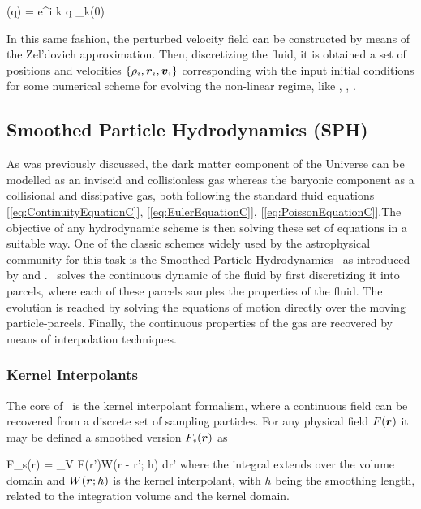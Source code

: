 \documentclass[a4,useAMS,usenatbib,usegraphicx,12pt]{article}
\begin{document}
{ \bds{\Psi}(\bds q) = \int {}e^{i \bds k \cdot \bds q}
\delta_{\bds k}(0) }

In this same fashion, the perturbed velocity field can be constructed by means
of the Zel'dovich approximation. Then, discretizing the fluid, it is obtained a 
set of positions and velocities $\{\rho_i,\boldsymbol{ r }_i, \boldsymbol{ v }_i\}$ corresponding 
with the input initial conditions for some numerical scheme for evolving the 
non-linear regime, like \SPH, \VPH, \AMR.


\subsection*{Smoothed Particle Hydrodynamics (SPH)}
As was previously discussed, the dark matter component of the Universe can be 
modelled as an inviscid and collisionless gas whereas the baryonic component as 
a collisional and dissipative gas, both following the standard fluid equations 
[\ref{eq:ContinuityEquationC}], [\ref{eq:EulerEquationC}], 
[\ref{eq:PoissonEquationC}].The objective of any hydrodynamic scheme is then 
solving these set of equations in a suitable way. One of the classic schemes 
widely used by the astrophysical community for this task is the Smoothed 
Particle Hydrodynamics \SPH\ as introduced by \citet{Lucy77} and 
\citet{Gingold77}. \SPH\ solves the continuous dynamic of the fluid by first
discretizing it into parcels, where each of these parcels samples the properties 
of the fluid. The evolution is reached by solving the equations of motion
directly over the moving particle-parcels. Finally, the continuous properties 
of the gas are recovered by means of interpolation techniques.

\subsubsection*{Kernel Interpolants}

The core of \SPH\ is the kernel interpolant formalism, where a continuous field 
can be recovered from a discrete set of sampling particles. For any physical 
field $F(\boldsymbol{ r })$ it may be defined a smoothed version $F_s(\boldsymbol{ r })$ as

{ F_s(\bds r) = \int_V \bds F(\bds r')W(\bds r - \bds r'; h) d\bds r' }
where the integral extends over the volume domain and $W(\boldsymbol{ r };h)$ is the 
kernel interpolant, with $h$ being the smoothing length, related to the 
integration volume and the kernel domain. 
\end{document}
